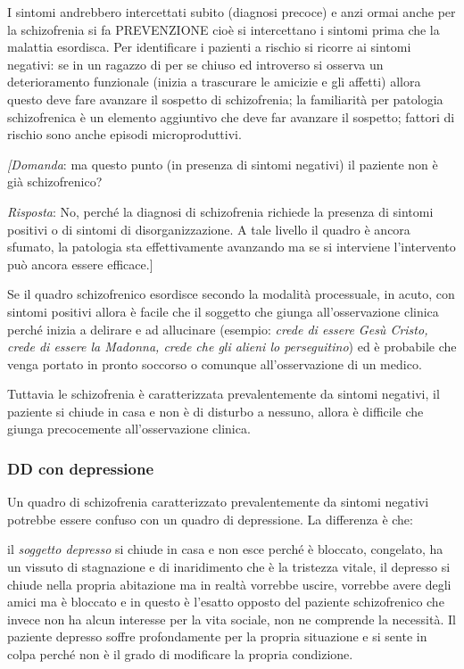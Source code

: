 I sintomi andrebbero intercettati subito (diagnosi precoce) e anzi ormai
anche per la schizofrenia si fa PREVENZIONE cioè si intercettano i
sintomi prima che la malattia esordisca. Per identificare i pazienti a
rischio si ricorre ai sintomi negativi: se in un ragazzo di per se
chiuso ed introverso si osserva un deterioramento funzionale (inizia a
trascurare le amicizie e gli affetti) allora questo deve fare avanzare
il sospetto di schizofrenia; la familiarità per patologia schizofrenica
è un elemento aggiuntivo che deve far avanzare il sospetto; fattori di
rischio sono anche episodi microproduttivi.

\emph{{[}Domanda}: ma questo punto (in presenza di sintomi negativi) il
paziente non è già schizofrenico?

\emph{Risposta}: No, perché la diagnosi di schizofrenia richiede la
presenza di sintomi positivi o di sintomi di disorganizzazione. A tale
livello il quadro è ancora sfumato, la patologia sta effettivamente
avanzando ma se si interviene l'intervento può ancora essere
efficace.{]}

Se il quadro schizofrenico esordisce secondo la modalità processuale, in
acuto, con sintomi positivi allora è facile che il soggetto che giunga
all'osservazione clinica perché inizia a delirare e ad allucinare
(esempio: \emph{crede di essere Gesù Cristo, crede di essere la Madonna,
crede che gli alieni lo perseguitino}) ed è probabile che venga portato
in pronto soccorso o comunque all'osservazione di un medico.

Tuttavia le schizofrenia è caratterizzata prevalentemente da sintomi
negativi, il paziente si chiude in casa e non è di disturbo a nessuno,
allora è difficile che giunga precocemente all'osservazione clinica.

\subsubsection{DD con depressione}

Un quadro di schizofrenia caratterizzato prevalentemente da sintomi
negativi potrebbe essere confuso con un quadro di depressione. La
differenza è che:

il \emph{soggetto depresso} si chiude in casa e non esce perché è
bloccato, congelato, ha un vissuto di stagnazione e di inaridimento che
è la tristezza vitale, il depresso si chiude nella propria abitazione ma
in realtà vorrebbe uscire, vorrebbe avere degli amici ma è bloccato e in
questo è l'esatto opposto del paziente schizofrenico che invece non ha
alcun interesse per la vita sociale, non ne comprende la necessità. Il
paziente depresso soffre profondamente per la propria situazione e si
sente in colpa perché non è il grado di modificare la propria
condizione.

